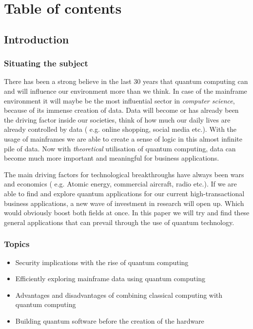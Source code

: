 \chapter{Table of contents}
\section{Introduction} %
\label{sec:introductie}
\subsection{Situating the subject}
 There has been a strong believe in the last 30 years that quantum computing can and will influence our environment more than we think. In case of the mainframe environment it will maybe be the most influential sector in \emph{computer science}, because of its immense creation of data. Data will become or has already been the driving factor inside our societies, think of how much our daily lives are already controlled by data ( e.g. online shopping, social media etc.). With the usage of mainframes we are able to create a sense of logic in this almost infinite pile of data. Now with \emph{ theoretical} utilisation of quantum computing, data can become much more important and meaningful for business applications. 
 
 The main driving factors for technological breakthroughs have always been wars and economics ( e.g. Atomic energy, commercial aircraft, radio etc.). If we are able to find and explore quantum applications for our current high-transactional business applications, a new wave of investment in research will open up. Which would obviously boost both fields at once. In this paper we will try and find these general applications that can prevail through the use of quantum technology.

\subsection{Topics}
\begin{itemize}
  \item Security implications with the rise of quantum computing
  \item Efficiently exploring mainframe data using quantum computing
  \item Advantages and disadvantages of combining classical computing with quantum computing
  \item Building quantum software before the creation of the hardware
\end{itemize}


